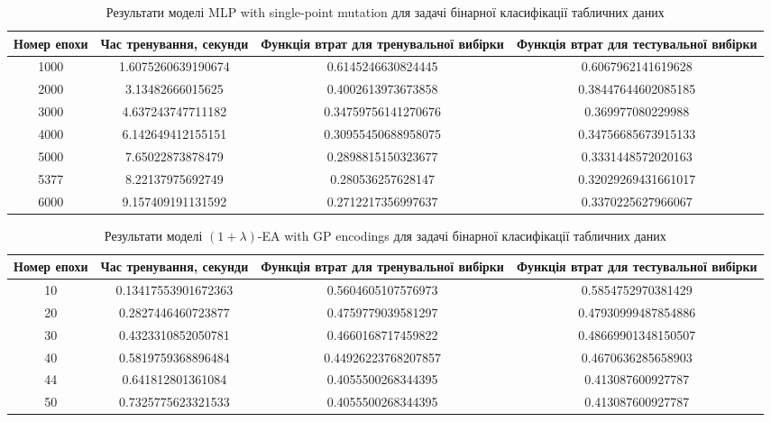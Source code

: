 \begin{table}[ht]
	\caption{Результати моделі MLP with single-point mutation для задачі бінарної класифікації табличних даних}
	\label{mlp_spm_bc_td_results}
	\centering
	\begin{adjustbox}{max width=\textwidth}
		\begin{tabular}{|c|c|c|c|}
			\hline 
			Номер епохи & Час тренування, секунди & Функція втрат для тренувальної вибірки & Функція втрат для тестувальної вибірки \\
			\hline 
			1000 & 1.6075260639190674 & 0.6145246630824445 & 0.6067962141619628 \\
			\hline 
			2000 & 3.13482666015625 & 0.4002613973673858 & 0.38447644602085185 \\
			\hline
			3000 & 4.637243747711182 & 0.34759756141270676 & 0.369977080229988 \\
			\hline
			4000 & 6.142649412155151 & 0.30955450688958075 & 0.34756685673915133 \\
			\hline
			5000 & 7.65022873878479 & 0.2898815150323677 & 0.3331448572020163 \\
			\hline
			5377 & 8.22137975692749 & 0.280536257628147 & 0.32029269431661017 \\
			\hline
			6000 & 9.157409191131592 & 0.2712217356997637 & 0.3370225627966067 \\
			\hline
		\end{tabular}
	\end{adjustbox}
\end{table}

\begin{table}[ht]
	\caption{Результати моделі $(1+\lambda)$-EA with GP encodings для задачі бінарної класифікації табличних даних}
	\label{ea_bc_td_results}
	\centering
	\begin{adjustbox}{max width=\textwidth}
		\begin{tabular}{|c|c|c|c|}
			\hline 
			Номер епохи & Час тренування, секунди & Функція втрат для тренувальної вибірки & Функція втрат для тестувальної вибірки \\
			\hline 
			10 & 0.13417553901672363 & 0.5604605107576973 & 0.5854752970381429 \\
			\hline 
			20 & 0.2827446460723877 & 0.4759779039581297 & 0.47930999487854886 \\
			\hline
			30 & 0.4323310852050781 & 0.4660168717459822 & 0.48669901348150507 \\
			\hline
			40 & 0.5819759368896484 & 0.44926223768207857 & 0.4670636285658903 \\
			\hline
			44 & 0.641812801361084 & 0.4055500268344395 & 0.413087600927787 \\
			\hline
			50 & 0.7325775623321533 & 0.4055500268344395 & 0.413087600927787 \\
			\hline
		\end{tabular}
	\end{adjustbox}
\end{table}

